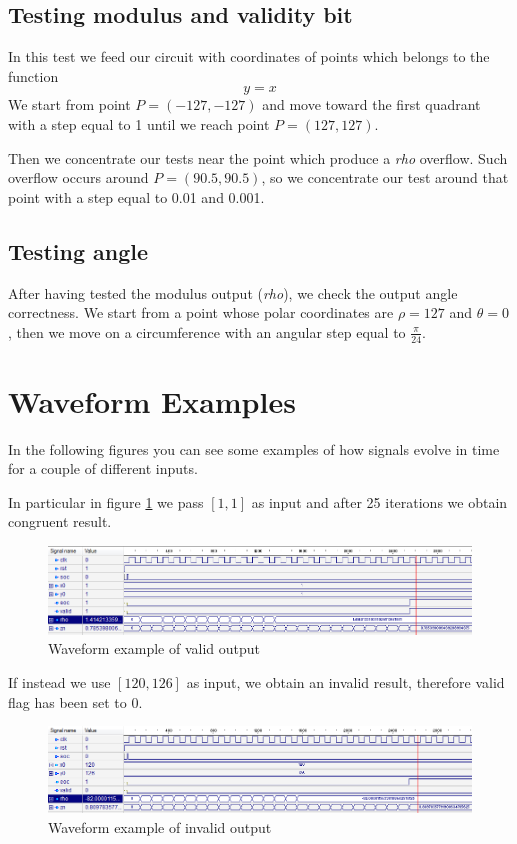 \documentclass[12pt,a4paper]{report}
\begin{document}
\subsection{Testing modulus and validity bit}
In this test we feed our circuit with coordinates of points which belongs to the function
	\begin{equation}
		y = x
  	\end{equation}
We start from point $P = \left(-127, -127\right)$ and move toward the first quadrant with a step equal to 1 until we reach point $P=(127,127)$.

Then we concentrate our tests near the point which produce a \emph{rho} overflow. Such overflow occurs around $P=(90.5,90.5)$, so we concentrate our test around that point with a step equal to 0.01 and 0.001.

\subsection{Testing angle}
After having tested the modulus output (\emph{rho}), we check the output angle correctness. We start from a point whose polar coordinates are $\rho=127$ and $\theta=0$, then we move on a circumference with an angular step equal to $\frac{\pi}{24}$.

\section{Waveform Examples}
In the following figures you can see some examples of how signals evolve in time for a couple of different inputs.

In particular in figure \ref{fig:bisector} we pass $[1,1]$ as input and after 25 iterations we obtain congruent result.


\begin{figure}[!h]
\centering
\includegraphics[width=\textwidth]{img/test-bisettrice.png}
\caption{Waveform example of valid output\label{fig:bisector}}
\end{figure}

If instead we use $[120,126]$ as input, we obtain an invalid result, therefore valid flag has been set to 0.

\begin{figure}[!h]
\centering
\includegraphics[width=\textwidth]{img/test-valid.png}
\caption{Waveform example of invalid output\label{fig:invalid}}
\end{figure}
\end{document}
